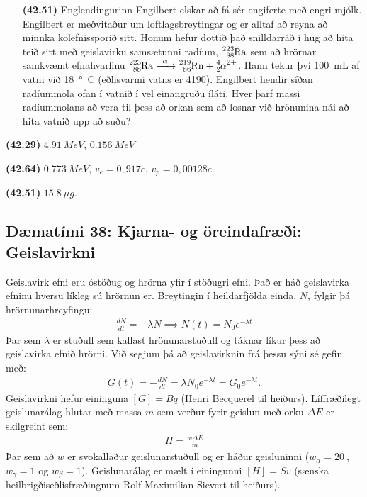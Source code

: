 \begin{enumerate}[label = \textbf{(\alph*)}]
\item[\textbf{(42.51)}] Englendingurinn Engilbert elskar að fá sér engiferte með engri mjólk. Engilbert er meðvitaður um loftlagsbreytingar og er alltaf að reyna að minnka kolefnissporið sitt. Honum hefur dottið það snilldarráð í hug að hita teið sitt með geislavirku samsætunni radíum, $\ce{^{223}_{88}Ra}$ sem að hrörnar samkvæmt efnahvarfinu $\ce{^{223}_{88}Ra ->[\alpha] ^{219}_{86}Rn + ^{4}_{2}\alpha^{2+}}$. Hann tekur því \SI{100}{mL} af vatni við \SI{18}{\degree C} (eðlisvarmi vatns er \SI{4190}{}). Engilbert hendir síðan radíummola ofan í vatnið í vel einangruðu íláti. Hver þarf massi radíummolans að vera til þess að orkan sem að losnar við hrönunina nái að hita vatnið upp að suðu?

\end{enumerate}

\begin{tcolorbox}
\begin{enumerate*}[label = ]
  \item \textbf{(42.29)} $\SI{4.91}{MeV}$, $\SI{0.156}{MeV}$
  \item \textbf{(42.64)} $\SI{0.773}{MeV}$, $v_e = 0,917c$, $v_p = 0,00128c$.
  \item \textbf{(42.51)} $\SI{15.8}{\mu g}$.
\end{enumerate*}
\end{tcolorbox}

\newpage

\subsection*{Dæmatími 38: Kjarna- og öreindafræði: Geislavirkni}

\begin{tcolorbox}
Geislavirk efni eru óstöðug og hrörna yfir í stöðugri efni. Það er háð geislavirka efninu hversu líkleg sú hrörnun er. Breytingin í heildarfjölda einda, $N$, fylgir þá hrörnunarhreyfingu:
\begin{align*}
    \frac{dN}{dt} = -\lambda N \implies N(t) = N_0e^{-\lambda t}
\end{align*}
Þar sem $\lambda$ er stuðull sem kallast hrönunarstuðull og táknar líkur þess að geislavirka efnið hrörni. Við segjum þá að geislavirknin frá þessu sýni sé gefin með:
\begin{align*}
    G(t) = -\frac{dN}{dt} = \lambda N_0 e^{-\lambda t} = G_0 e^{-\lambda t}.
\end{align*}
Geislavirkni hefur eininguna $\left[ G \right] = \si{Bq}$ (Henri Becquerel til heiðurs). Líffræðilegt geislunarálag hlutar með massa $m$ sem verður fyrir geislun með orku $\Delta E$ er skilgreint sem:
\begin{align*}
    H = \frac{w\Delta E}{m}
\end{align*}
Þar sem að $w$ er svokallaður geislunarstuðull og er háður geisluninni ($w_\alpha = \SI{20}{}$, $w_\gamma = 1$ og $w_\beta = 1$). Geislunarálag er mælt í einingunni $\left[ H \right] = \si{Sv}$ (sænska heilbrigðiseðlisfræðingnum Rolf Maximilian Sievert til heiðurs).

\end{tcolorbox}

